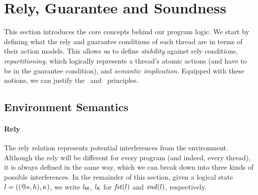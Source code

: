 \section{Rely, Guarantee and Soundness}\label{sec:semantics}
This section introduces the core concepts behind our program logic. We start by defining what the rely and guarantee conditions of each thread are in terms of their action models. This allows us to define \emph{stability} against rely conditions, \emph{repartitioning}, which logically represents a thread's atomic actions (and have to be in the guarantee condition), and \emph{semantic implication}. Equipped with these notions, we can justify the \shiftRule\ and \extendRule\ principles. 
%
%
\subsection{Environment Semantics}
\paragraph{\textbf{Rely}}
The rely relation represents potential interferences from the environment. Although the rely will be different for every program (and indeed, every thread), it is always defined in the same way, which we can break down into three kinds of possible interferences. In the remainder of this section, given a logical state $l = ((@s, h),\kappa_{})$, we write $l_{\mathsf{M}}$, $l_{\mathsf{K}}$ for $\mathit{fst}(l)$ and $\mathit{snd}(l)$, respectively.

